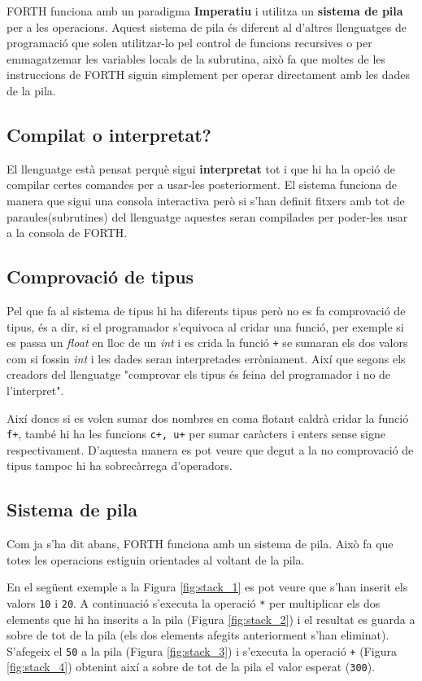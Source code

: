 \documentclass{article}
\begin{document}
FORTH funciona amb un paradigma \textbf{Imperatiu} i utilitza un \textbf{sistema de pila} per a les operacions. Aquest sistema de pila és diferent al d'altres llenguatges de programació que solen utilitzar-lo pel control de funcions recursives o per emmagatzemar les variables locals de la subrutina, això fa que moltes de les instruccions de FORTH siguin simplement per operar directament amb les dades de la pila.

\subsection{Compilat o interpretat?}

El llenguatge està pensat perquè sigui \textbf{interpretat} tot i que hi ha la opció de compilar certes comandes per a usar-les posteriorment. El sistema funciona de manera que sigui una consola interactiva però si s'han definit fitxers amb tot de paraules(subrutines) del llenguatge aquestes seran compilades per poder-les usar a la consola de FORTH.

\subsection{Comprovació de tipus}

Pel que fa al sistema de tipus hi ha diferents tipus però no es fa comprovació de tipus, és a dir, si el programador s'equivoca al cridar una funció, per exemple si es passa un \emph{float} en lloc de un \emph{int} i es crida la funció \texttt{+} se sumaran els dos valors com si fossin \emph{int} i les dades seran interpretades erròniament. Així que segons els creadors del llenguatge "comprovar els tipus és feina del programador i no de l'interpret".

Així doncs si es volen sumar dos nombres en coma flotant caldrà cridar la funció \texttt{f+}, també hi ha les funcions \texttt{c+, u+} per sumar caràcters i enters sense signe respectivament. D'aquesta manera es pot veure que degut a la no comprovació de tipus tampoc hi ha sobrecàrrega d'operadors. 

\subsection{Sistema de pila} 
Com ja s'ha dit abans, FORTH funciona amb un sistema de pila. Això fa que totes les operacions estiguin orientades al voltant de la pila. 

En el següent exemple a la Figura \ref*{fig:stack_1} es pot veure que s'han inserit els valors \texttt{10} i \texttt{20}. A continuació s'executa la operació \texttt{*} per multiplicar els dos elements que hi ha inserits a la pila (Figura \ref*{fig:stack_2}) i el resultat es guarda a sobre de tot de la pila (els dos elements afegits anteriorment s'han eliminat). S'afegeix el \texttt{50} a la pila (Figura \ref*{fig:stack_3}) i s'executa la operació \texttt{+} (Figura \ref*{fig:stack_4}) obtenint així a sobre de tot de la pila el valor esperat (\texttt{300}).
\end{document}
